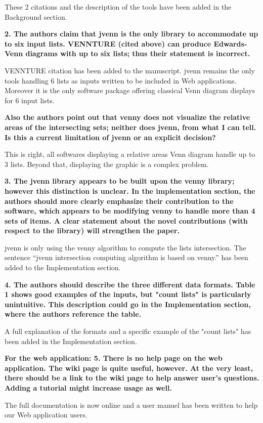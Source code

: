 \documentclass[10pt,stdletter,dateno,sigleft]{newlfm} %
\begin{document}
\begin{newlfm}
These 2 citations and the description of the tools have been added in the
Background section.

\textbf{2. The authors claim that jvenn is the only library to accommodate up
to six input lists. VENNTURE (cited above) can produce Edwards-Venn
diagrams with up to six lists; thus their statement is incorrect.}

VENNTURE citation has been added to the manuscript. jvenn remains the only
tools handling 6 lists as inputs written to be included in Web applications.
Moreover it is the only software package offering classical Venn diagram displays
for 6 input lists.

\textbf{Also the authors point out that venny does not visualize the relative
areas of the intersecting sets; neither does jvenn, from what I can
tell. Is this a current limitation of jvenn or an explicit decision?}

This is right, all softwares displaying a relative areas Venn diagram handle up
to 3 lists. Beyond that, displaying the graphic is a complex problem.

\textbf{3. The jvenn library appears to be built upon the venny library;
however this distinction is unclear. In the implementation section,
the authors should more clearly emphasize their contribution to the
software, which appears to be modifying venny to handle more than 4
sets of items. A clear statement about the novel contributions (with
respect to the library) will strengthen the paper.}

jvenn is only using the venny algorithm to compute the lists intersection.
The sentence ``jvenn intersection computing algorithm is based on venny.'' has 
been added to the Implementation section.


\textbf{4. The authors should describe the three different data formats.
Table 1 shows good examples of the inputs, but "count lists" is
particularly unintuitive. This description could go in the
Implementation section, where the authors reference the table.}

A full explanation of the formats and a specific example of the "count lists"
has been added in the Implementation section.

\textbf{For the web application: 5. There is no help page on the web
application. The wiki page is quite useful, however. At the very least, there
should be a link to the wiki page to help answer user's questions. Adding a 
tutorial might increase usage as well.}

The full documentation is now online and a user manuel has been written to help
our Web application users.


\end{newlfm}
\end{document}

